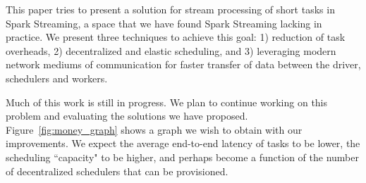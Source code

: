 This paper tries to present a solution for stream processing of short tasks in Spark Streaming, a space that we have found Spark Streaming lacking in practice.
We present three techniques to achieve this goal: 1) reduction of task overheads, 2) decentralized and elastic scheduling, and 3) leveraging modern network mediums of communication for faster transfer of data between the driver, schedulers and workers.

Much of this work is still in progress. We plan to continue working on this problem and evaluating the solutions we have proposed. Figure~\ref{fig:money_graph} shows a graph we wish to obtain with our improvements. We expect the average end-to-end latency of tasks to be lower, the scheduling ``capacity" to be higher, and perhaps become a function of the number of decentralized schedulers that can be provisioned.

